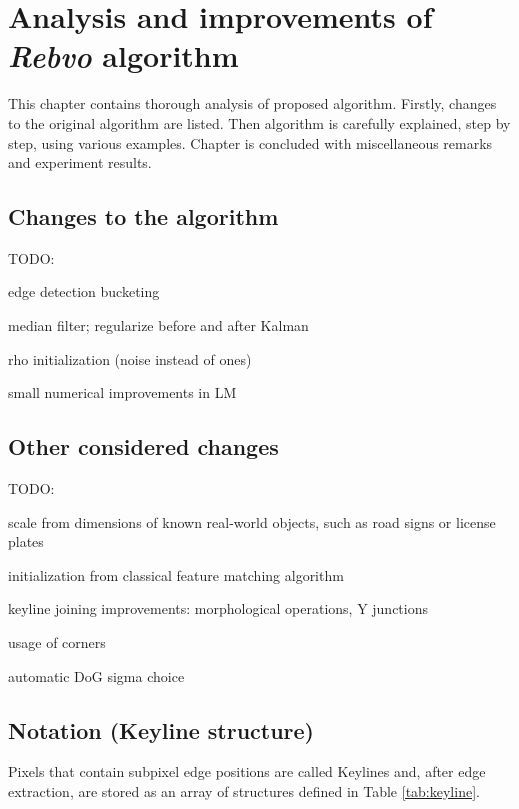 \chapter{Analysis and improvements of \textit{Rebvo} algorithm}
\label{cha:intro2}

This chapter contains thorough analysis of proposed algorithm. Firstly, changes to the original algorithm are listed. Then algorithm is carefully explained, step by step, using various examples. Chapter is concluded with miscellaneous remarks and experiment results.

\section{Changes to the algorithm}
\label{sec:changes}

TODO:

edge detection bucketing

median filter; regularize before and after Kalman

rho initialization (noise instead of ones)

small numerical improvements in LM


\section{Other considered changes}
\label{sec:rejected}

TODO:

scale from dimensions of known real-world objects, such as road signs or license plates

initialization from classical feature matching algorithm

keyline joining improvements: morphological operations, Y junctions

usage of corners

automatic DoG sigma choice


\section{Notation (Keyline structure)}

Pixels that contain subpixel edge positions are called Keylines and, after edge extraction, are stored as an array of structures defined in Table \ref{tab:keyline}.

